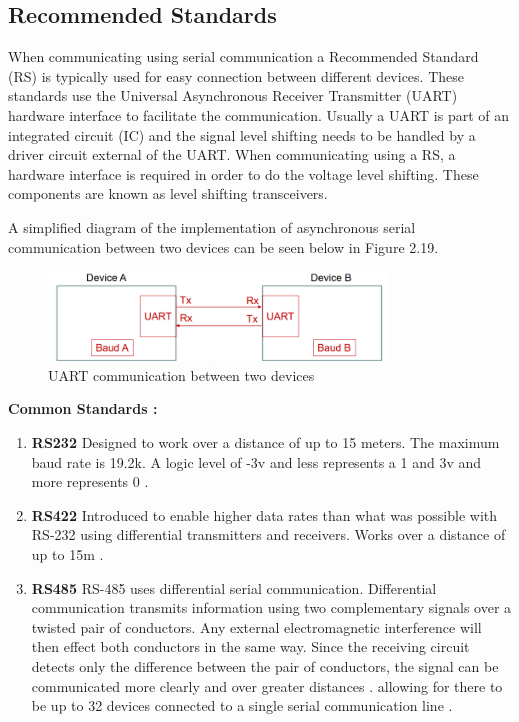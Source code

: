 \newpage
\subsection{Recommended Standards}
When communicating using serial communication a Recommended Standard (RS) is typically used for easy connection between different devices. These standards use the Universal Asynchronous Receiver Transmitter (UART) hardware interface to facilitate the communication. Usually a UART is part of an integrated circuit (IC) and the signal level shifting needs to be handled by a driver circuit external of the UART. When communicating using a RS, a hardware interface is required in order to do the voltage level shifting. These components are known as level shifting transceivers. 

A simplified diagram of the implementation of asynchronous serial communication between two devices can be seen below in Figure 2.19.
\begin{figure}[H]
\centering
\includegraphics[width=0.8\textwidth]{UART.png}
\caption{UART communication between two devices }
\label{fig:comms}
\end{figure}

\textbf{Common Standards :}
\begin{enumerate}
\item{\textbf{RS232}}
Designed to work over a distance of up to 15 meters. The maximum baud rate is 19.2k. A logic level of -3v and less represents a 1 and 3v and more represents 0 \cite{RS232}.

\item{\textbf{RS422}}
Introduced to enable higher data rates than what was possible with RS-232 using differential transmitters and receivers. Works over a distance of up to 15m \cite{RS422}. 

\item{\textbf{RS485}}
RS-485 uses differential serial communication. Differential communication transmits information using two complementary signals over a twisted pair of conductors. Any external electromagnetic interference will then effect both conductors in the same way. Since the receiving circuit detects only the difference between the pair of conductors, the signal can be communicated more clearly and over greater distances \cite{Differential communication}. allowing for there to be up to 32 devices connected to a single serial communication line \cite{RS485}. 
\end{enumerate}

